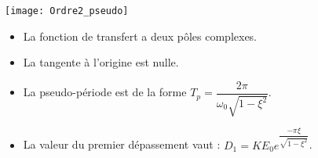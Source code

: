 \begin{marginfigure}
\texttt{[image: Ordre2\_pseudo]}
\end{marginfigure}

\begin{resultat}
\begin{itemize} 
\item La fonction de transfert a deux pôles complexes.
\item La tangente à l'origine est nulle.
\item La pseudo-période est de la forme $T_p=\dfrac{2\pi }{\omega_0 \sqrt{1-\xi^2}}$.
\item La valeur du premier dépassement vaut :  $D_1=KE_0e^{\dfrac{-\pi \xi }{\sqrt{1-\xi^2}}}$.
\end{itemize}
\end{resultat}

